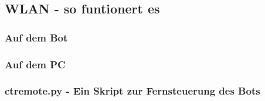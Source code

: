 \subsection{WLAN - so funtionert es}
\label{wlan}

\subsubsection{Auf dem Bot}

\subsubsection{Auf dem PC}

\subsubsection{ctremote.py - Ein Skript zur Fernsteuerung des Bots}

